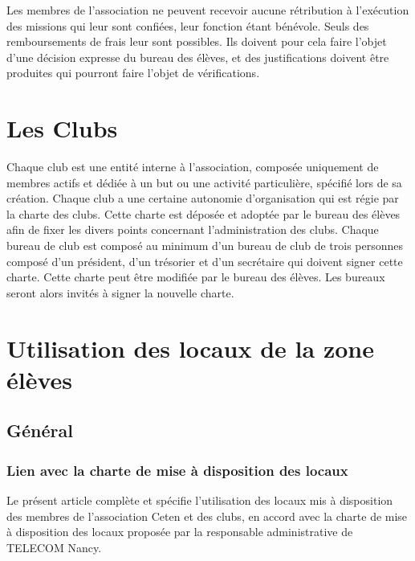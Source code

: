 \documentclass{article} %
\begin{document}
			Les membres de l’association ne peuvent recevoir aucune rétribution
			à l'exécution des missions qui leur sont confiées, leur fonction
			étant bénévole. Seuls des remboursements de frais leur sont
			possibles. Ils doivent pour cela faire l'objet d'une décision
			expresse du bureau des élèves, et des justifications doivent être
			produites qui pourront faire l'objet de vérifications.

	\section{Les Clubs}
\label{sec:les_clubs}

		Chaque club est une entité interne à l’association, composée uniquement de
		membres actifs et dédiée à un but ou une activité particulière, spécifié lors
		de sa création. Chaque club a une certaine autonomie d'organisation qui est
		régie par la charte des clubs. Cette charte est déposée et adoptée par le
		bureau des élèves afin de fixer les divers points concernant l’administration
		des clubs. Chaque bureau de club est composé au minimum d’un bureau de club
		de trois personnes composé d’un président, d’un trésorier et d’un secrétaire
		qui doivent signer cette charte. Cette charte peut être modifiée par le
		bureau des élèves. Les bureaux seront alors invités à signer la nouvelle
		charte.

	\section{Utilisation des locaux de la zone élèves}
\label{sec:utilisation_des_locaux_de_la_zone_eleves}

		\subsection{Général}
\label{sub:general}

			\subsubsection{Lien avec la charte de mise à disposition des locaux}
\label{ssub:lien_avec_la_charte_de_mise_a_disposition_des_locaux}

				Le présent article complète et spécifie l’utilisation des locaux
				mis à disposition des membres de l’association Ceten et des
				clubs, en accord avec la charte de mise à disposition des locaux
				proposée par la responsable administrative de TELECOM
				Nancy.
\end{document}
